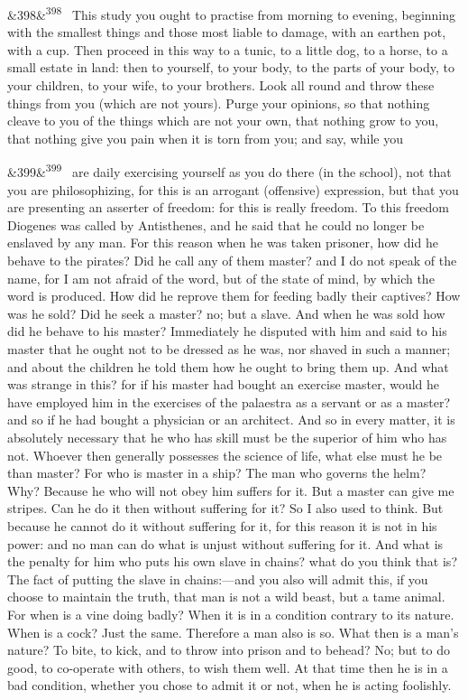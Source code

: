 \documentclass[12pt]{article}
\newcommand{\para}[1][]{\par\noindent\ifx&#1&\else\textsuperscript{\footnotesize #1}~\fi}
\begin{document}
\para[398] This study you ought to practise from morning to evening, beginning with the smallest things and those most liable to damage, with an earthen pot, with a cup. Then proceed in this way to a tunic, to a little dog, to a horse, to a small estate in land: then to yourself, to your body, to the parts of your body, to your children, to your wife, to your brothers. Look all round and throw these things from you (which are not yours). Purge your opinions, so that nothing cleave to you of the things which are not your own, that nothing grow to you, that nothing give you pain when it is torn from you; and say, while you

\para[399] are daily exercising yourself as you do there (in the school), not that you are philosophizing, for this is an arrogant (offensive) expression, but that you are presenting an asserter of freedom: for this is really freedom. To this freedom Diogenes was called by Antisthenes, and he said that he could no longer be enslaved by any man. For this reason when he was taken prisoner, how did he behave to the pirates? Did he call any of them master? and I do not speak of the name, for I am not afraid of the word, but of the state of mind, by which the word is produced. How did he reprove them for feeding badly their captives? How was he sold? Did he seek a master? no; but a slave. And when he was sold how did he behave to his master? Immediately he disputed with him and said to his master that he ought not to be dressed as he was, nor shaved in such a manner; and about the children he told them how he ought to bring them up. And what was strange in this? for if his master had bought an exercise master, would he have employed him in the exercises of the palaestra as a servant or as a master? and so if he had bought a physician or an architect. And so in every matter, it is absolutely necessary that he who has skill must be the superior of him who has not. Whoever then generally possesses the science of life, what else must he be than master? For who is master in a ship? The man who governs the helm? Why? Because he who will not obey him suffers for it. But a master can give me stripes. Can he do it then without suffering for it? So I also used to think. But because he cannot do it without suffering for it, for this reason it is not in his power: and no man can do what is unjust without suffering for it. And what is the penalty for him who puts his own slave in chains? what do you think that is? The fact of putting the slave in chains:—and you also will admit this, if you choose to maintain the truth, that man is not a wild beast, but a tame animal. For when is a vine doing badly? When it is in a condition contrary to its nature. When is a cock? Just the same. Therefore a man also is so. What then is a man's nature? To bite, to kick, and to throw into prison and to behead? No; but to do good, to co-operate with others, to wish them well. At that time then he is in a bad condition, whether you chose to admit it or not, when he is acting foolishly.
\end{document}
